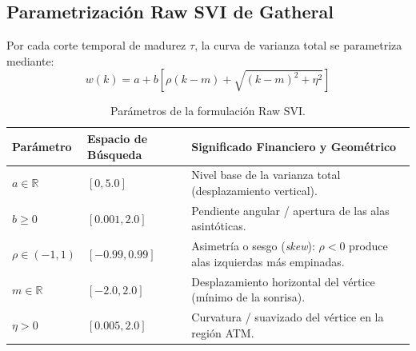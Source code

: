 \documentclass[11pt,a4paper]{article}
\begin{document}
\subsection{Parametrización Raw SVI de Gatheral}
Por cada corte temporal de madurez $\tau$, la curva de varianza total se parametriza mediante:
\begin{equation}
    w(k) = a + b \left[ \rho (k - m) + \sqrt{(k - m)^2 + \eta^2} \right]
\end{equation}
\begin{table}[htbp]
\centering
\begin{tabular}{lll}
\toprule
\textbf{Parámetro} & \textbf{Espacio de Búsqueda} & \textbf{Significado Financiero y Geométrico} \\
\midrule
$a \in \mathbb{R}$ & $[0, 5.0]$ & Nivel base de la varianza total (desplazamiento vertical). \\
$b \ge 0$ & $[0.001, 2.0]$ & Pendiente angular / apertura de las alas asintóticas. \\
$\rho \in (-1, 1)$ & $[-0.99, 0.99]$ & Asimetría o sesgo (\textit{skew}): $\rho < 0$ produce alas izquierdas más empinadas. \\
$m \in \mathbb{R}$ & $[-2.0, 2.0]$ & Desplazamiento horizontal del vértice (mínimo de la sonrisa). \\
$\eta > 0$ & $[0.005, 2.0]$ & Curvatura / suavizado del vértice en la región ATM. \\
\bottomrule
\end{tabular}
\caption{Parámetros de la formulación Raw SVI.}
\end{table}
\end{document}
